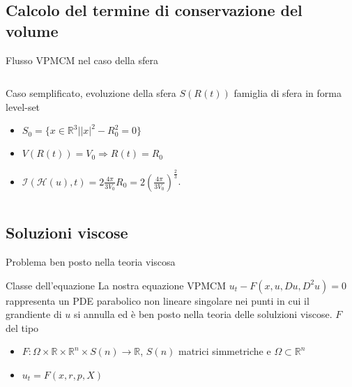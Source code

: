 \subsection*{Calcolo del termine di conservazione del volume}
\begin{frame}{Flusso VPMCM nel caso della sfera}
  \begin{columns}[T]
    \begin{column}{6.5cm}
      \begin{exampleblock}{Caso semplificato, evoluzione della sfera}
        $S(R(t))$ famiglia di sfera in forma level-set
        \begin{itemize}
        \item $S_0=\{x\in\mathbb{R}^3| |x|^2-R_0^2=0\}$
        \item $V(R(t))=V_0\Rightarrow R(t)=R_0$
        \item $\mathcal{I}(\mathcal{H}(u),t)=2\frac{4\pi}{3V_0}R_0=2\left(\frac{4\pi}{3V_0}\right)^\frac{2}{3}$.
        \end{itemize}
      \end{exampleblock}
    \end{column}
    \begin{column}[T]{3.5cm}
      \begin{center}
      \end{center}
  \end{column}
\end{columns}
\end{frame}
\subsection*{Soluzioni viscose}
\begin{frame}{Problema ben posto nella teoria viscosa}
     \begin{block}{Classe dell'equazione}
       La nostra equazione VPMCM \alert{$u_t-F(x,u,Du,D^2u)=0$}
       rappresenta un PDE parabolico non lineare singolare nei punti in cui
       il grandiente di $u$ si annulla ed è ben posto nella teoria
       delle solulzioni viscose. $F$ del tipo
       \begin{itemize}
         \item $F:\Omega\times\mathbb{R}\times\mathbb{R}^n\times
           S(n)\to\mathbb{R}$, $S(n)$ matrici simmetriche e
           $\Omega\subset\mathbb{R}^n$
         \item $u_t=F(x,r,p,X)$
       \end{itemize}
     \end{block}
\end{frame}

